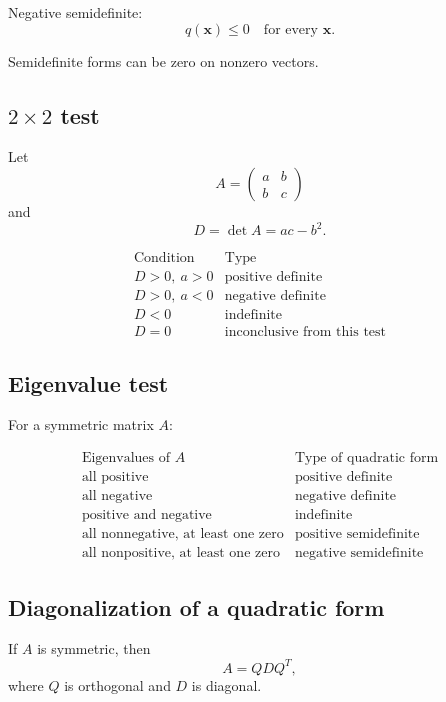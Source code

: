 Negative semidefinite:
\[
\boxed{
    q(\mathbf x)\le0
    \quad\text{for every }\mathbf x.
}
\]

Semidefinite forms can be zero on nonzero vectors.

\subsection*{\(2\times2\) test}

Let
\[
    A=
    \begin{pmatrix}
    a&b\\
    b&c
    \end{pmatrix}
\]
and
\[
    D=\det A=ac-b^2.
\]

\[
\begin{array}{c|c}
\text{Condition} & \text{Type} \\ \hline
D>0,\ a>0 & \text{positive definite}\\[1mm]
D>0,\ a<0 & \text{negative definite}\\[1mm]
D<0 & \text{indefinite}\\[1mm]
D=0 & \text{inconclusive from this test}
\end{array}
\]

\subsection*{Eigenvalue test}

For a symmetric matrix \(A\):

\[
\begin{array}{c|c}
\text{Eigenvalues of }A & \text{Type of quadratic form} \\ \hline
\text{all positive} & \text{positive definite}\\[1mm]
\text{all negative} & \text{negative definite}\\[1mm]
\text{positive and negative} & \text{indefinite}\\[1mm]
\text{all nonnegative, at least one zero} & \text{positive semidefinite}\\[1mm]
\text{all nonpositive, at least one zero} & \text{negative semidefinite}
\end{array}
\]

\subsection*{Diagonalization of a quadratic form}

If \(A\) is symmetric, then
\[
\boxed{
    A=QDQ^T,
}
\]
where \(Q\) is orthogonal and \(D\) is diagonal.

